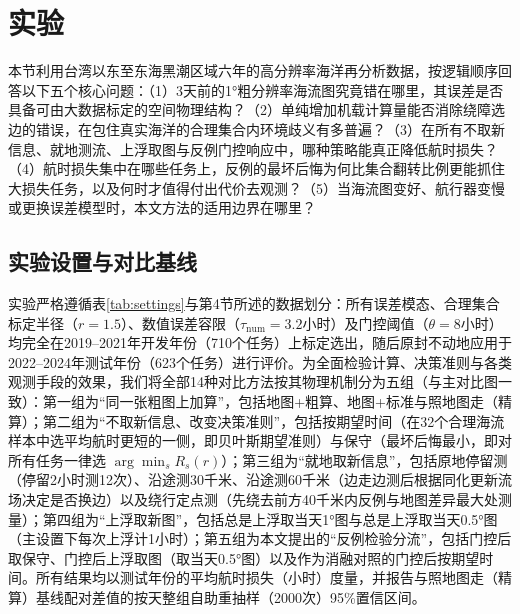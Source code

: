 \section{实验}

本节利用台湾以东至东海黑潮区域六年的高分辨率海洋再分析数据，按逻辑顺序回答以下五个核心问题：（1）3天前的1°粗分辨率海流图究竟错在哪里，其误差是否具备可由大数据标定的空间物理结构？（2）单纯增加机载计算量能否消除绕障选边的错误，在包住真实海洋的合理集合内环境歧义有多普遍？（3）在所有不取新信息、就地测流、上浮取图与反例门控响应中，哪种策略能真正降低航时损失？（4）航时损失集中在哪些任务上，反例的最坏后悔为何比集合翻转比例更能抓住大损失任务，以及何时才值得付出代价去观测？（5）当海流图变好、航行器变慢或更换误差模型时，本文方法的适用边界在哪里？

\subsection{实验设置与对比基线}
实验严格遵循表\ref{tab:settings}与第4节所述的数据划分：所有误差模态、合理集合标定半径（$r=1.5$）、数值误差容限（$\tau_{\text{num}}=3.2$小时）及门控阈值（$\theta=8$小时）均完全在2019--2021年开发年份（710个任务）上标定选出，随后原封不动地应用于2022--2024年测试年份（623个任务）进行评价。为全面检验计算、决策准则与各类观测手段的效果，我们将全部14种对比方法按其物理机制分为五组（与主对比图一致）：第一组为“同一张粗图上加算”，包括地图+粗算、地图+标准与照地图走（精算）；第二组为“不取新信息、改变决策准则”，包括按期望时间（在32个合理海流样本中选平均航时更短的一侧，即贝叶斯期望准则）与保守（最坏后悔最小，即对所有任务一律选 $\arg\min_s R_s(r)$）；第三组为“就地取新信息”，包括原地停留测（停留2小时测12次）、沿途测30千米、沿途测60千米（边走边测后根据同化更新流场决定是否换边）以及绕行定点测（先绕去前方40千米内反例与地图差异最大处测量）；第四组为“上浮取新图”，包括总是上浮取当天1°图与总是上浮取当天0.5°图（主设置下每次上浮计1小时）；第五组为本文提出的“反例检验分流”，包括门控后取保守、门控后上浮取图（取当天0.5°图）以及作为消融对照的门控后按期望时间。所有结果均以测试年份的平均航时损失（小时）度量，并报告与照地图走（精算）基线配对差值的按天整组自助重抽样（2000次）95\%置信区间。

